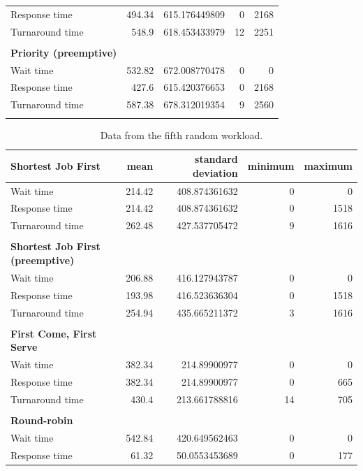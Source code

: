 \documentclass[12pt,letterpaper]{article}
\begin{document}
\begin{appendices}
\begin{table}[H]
\begin{tabular}{l r r r r}
Response time &		494.34 &	615.176449809 &	0 &	2168 	\\
Turnaround time &	548.9 &	618.453433979 &	12 &	2251 	\\
					\\
					\textbf{Priority (preemptive)} \\
					\hline
					Wait time &		532.82 &	672.008770478 &	0 &	0 	\\
Response time &		427.6 &	615.420376653 &	0 &	2168 	\\
Turnaround time &	587.38 &	678.312019354 &	9 &	2560 	\\
					\\
				\end{tabular}
			\end{table}

			\begin{table}[H]
	 			\label{table:data-rand5}
	  			\caption{Data from the fifth random workload.}
		  		\begin{tabular}{l r r r r}
					\textbf{Shortest Job First} & mean & standard deviation & minimum & maximum\\
					\hline
Wait time &		214.42 &	408.874361632 &	0 &	0 	\\
Response time &		214.42 &	408.874361632 &	0 &	1518 	\\
Turnaround time &	262.48 &	427.537705472 &	9 &	1616 	\\
					\\
					\textbf{Shortest Job First (preemptive)} \\
					\hline
					Wait time &		206.88 &	416.127943787 &	0 &	0 	\\
Response time &		193.98 &	416.523636304 &	0 &	1518 	\\
Turnaround time &	254.94 &	435.665211372 &	3 &	1616 	\\
					\\
					\textbf{First Come, First Serve} \\
					\hline
					Wait time &		382.34 &	214.89900977 &	0 &	0 	\\
Response time &		382.34 &	214.89900977 &	0 &	665 	\\
Turnaround time &	430.4 &	213.661788816 &	14 &	705 	\\
					\\
					\textbf{Round-robin} \\
					\hline
					Wait time &		542.84 &	420.649562463 &	0 &	0 	\\
Response time &		61.32 &	50.0553453689 &	0 &	177 	\\

\end{tabular}
\end{table}
\end{appendices}
\end{document}
